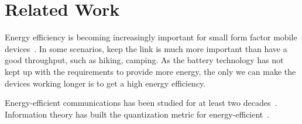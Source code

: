\section{Related Work}
\label{sec:related}


Energy efficiency is becoming increasingly important for small form factor mobile devices~\cite{miao2008energy}.
In some scenarios, keep the link is much more important than have a good throughput, such as hiking, camping.
As the battery technology has not kept up with the requirements to provide more energy, the only we can make the devices working longer is to get a high energy efficiency. 

Energy-efficient communications has been studied for at least two decades~\cite{miao2009cross}. Information theory has built the quantization metric for energy-efficient~\cite{meshkati2005energy}.



